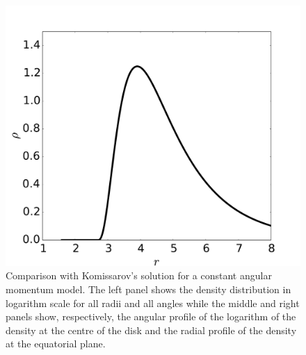 \documentclass{aa}
\begin{document}
\begin{figure}[t]
\includegraphics[scale=0.16]{figures/fig1c.pdf}
\caption{Comparison with Komissarov's solution for a constant angular momentum model. The left panel shows the density distribution in logarithm scale for all radii and all angles while the middle and right panels show, respectively, the angular profile of the logarithm of the density at the centre of the disk and the radial profile of the density at the equatorial plane.}
           \label{komissarov}%
 \end{figure}
\end{document}
